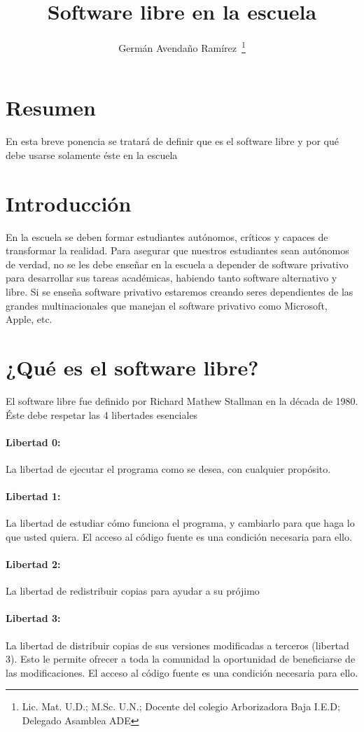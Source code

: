 \documentclass[11pt,letterpaper]{article}
\author{Germán Avendaño Ramírez~\thanks{Lic. Mat. U.D.; M.Sc. U.N.; Docente del colegio Arborizadora Baja I.E.D; Delegado Asamblea ADE}}
\title{Software libre en la escuela}
\begin{document}
\maketitle
\section{Resumen}
En esta breve ponencia se tratará de definir que es el software libre y por qué debe usarse solamente éste en la escuela
\section{Introducción}
En la escuela se deben formar estudiantes autónomos, críticos y capaces de transformar la realidad. Para asegurar que nuestros estudiantes sean autónomos de verdad, no se les debe enseñar en la escuela a depender de software privativo para desarrollar sus tareas académicas, habiendo tanto software alternativo y libre. Si se enseña software privativo estaremos creando seres dependientes de las grandes multinacionales que manejan el software privativo como Microsoft, Apple, etc.
\section{¿Qué es el software libre?}
El software libre fue definido por Richard Mathew Stallman en la década de 1980. Éste debe respetar las 4 libertades esenciales \cite{gnu}
\paragraph{Libertad 0:} 
La libertad de ejecutar el programa como se desea, con cualquier propósito.
\paragraph{Libertad 1:} La libertad de estudiar cómo funciona el programa, y cambiarlo para que haga lo que usted quiera. El acceso al código fuente es una condición necesaria para ello.
\paragraph{Libertad 2:} La libertad de redistribuir copias para ayudar a su prójimo
\paragraph{Libertad 3:} La libertad de distribuir copias de sus versiones modificadas a terceros (libertad 3). Esto le permite ofrecer a toda la comunidad la oportunidad de beneficiarse de las modificaciones. El acceso al código fuente es una condición necesaria para ello.
\end{document}
